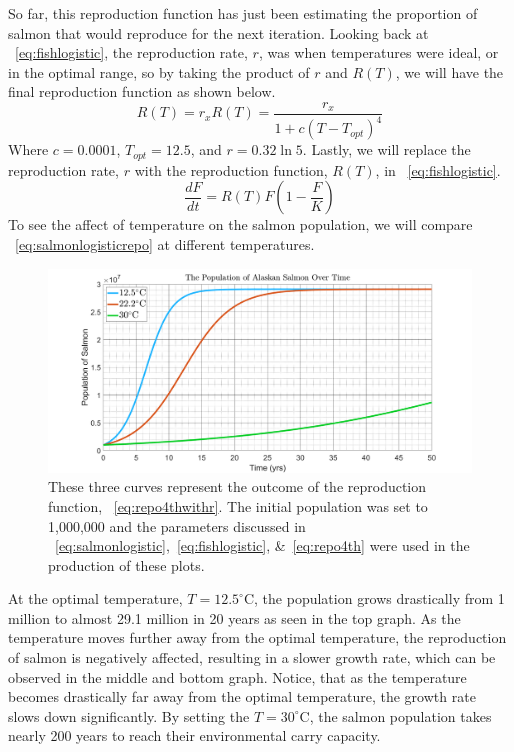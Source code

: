 So far, this reproduction function has just been estimating the proportion of salmon that would reproduce for the next iteration.
Looking back at \equationautorefname~\eqref{eq:fishlogistic}, the reproduction rate, $r$, was when temperatures were ideal, or in the optimal range, so by taking the product of $r$ and $R(T)$, we will have the final reproduction function as shown below.
\begin{equation}\label{eq:repo4thwithr}
    R(T) = r_xR(T) = \frac{r_x}{1+c(T-T_{opt})^4}
\end{equation}
Where $c=0.0001$, $T_{opt}=12.5$, and $r=0.32\ln{5}$.
Lastly, we will replace the reproduction rate, $r$ with the reproduction function, $R(T)$, in \equationautorefname~\eqref{eq:fishlogistic}.
\begin{equation}\label{eq:salmonlogisticrepo}
    \frac{dF}{dt} = R(T)F\left(1-\frac{F}{K}\right)
\end{equation}
To see the affect of temperature on the salmon population, we will compare \equationautorefname~\eqref{eq:salmonlogisticrepo} at different temperatures.
\begin{figure}[H]
    \centering
    \includegraphics[width=14cm]{Pictures/Salmon Pop/Salmon at 3 dif temps.png}
    \caption{These three curves represent the outcome of the reproduction function, \equationautorefname~\eqref{eq:repo4thwithr}. The initial population was set to 1,000,000 and the parameters discussed in \equationautorefname~\eqref{eq:salmonlogistic},~\eqref{eq:fishlogistic}, \&~\eqref{eq:repo4th} were used in the production of these plots.}
    \label{fig:salmonrepocomparison}
\end{figure}
At the optimal temperature, $T=12.5^{\circ}$C, the population grows drastically from 1 million to almost 29.1 million in 20 years as seen in the top graph.
As the temperature moves further away from the optimal temperature, the reproduction of salmon is negatively affected, resulting in a slower growth rate, which can be observed in the middle and bottom graph.
Notice, that as the temperature becomes drastically far away from the optimal temperature, the growth rate slows down significantly. 
By setting the $T=30^{\circ}$C, the salmon population takes nearly 200 years to reach their environmental carry capacity.

